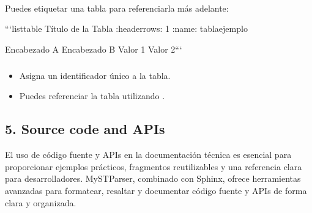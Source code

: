 \documentclass[a4paper,10pt,oneside,spanish,openany]{sphinxmanual}
\begin{document}
\paragraph{}
\label{\detokenize{configuracion_inicial/013.guia_de_myst_parser:agregar-una-etiqueta-a-una-tabla}}
\sphinxAtStartPar
Puedes etiquetar una tabla para referenciarla más adelante:

\begin{sphinxVerbatim}[commandchars=\\\{\}]
```\PYGZob{}list\PYGZhy{}table\PYGZcb{} Título de la Tabla
:header\PYGZhy{}rows: 1
:name: tabla\PYGZhy{}ejemplo

\PYGZhy{} Encabezado A
Encabezado B
\PYGZhy{} Valor 1
Valor 2```
\end{sphinxVerbatim}


\subparagraph{}
\label{\detokenize{configuracion_inicial/013.guia_de_myst_parser:id4}}\begin{itemize}
\item {} 
\sphinxAtStartPar
{} Asigna un identificador único a la tabla.

\item {} 
\sphinxAtStartPar
Puedes referenciar la tabla utilizando .

\end{itemize}


\subsection{5. Source code and APIs}
\label{\detokenize{configuracion_inicial/013.guia_de_myst_parser:source-code-and-apis}}
\sphinxAtStartPar
El uso de código fuente y APIs en la documentación técnica es esencial para proporcionar ejemplos prácticos, fragmentos reutilizables y una referencia clara para desarrolladores. MyST\sphinxhyphen{}Parser, combinado con Sphinx, ofrece herramientas avanzadas para formatear, resaltar y documentar código fuente y APIs de forma clara y organizada.


\subsubsection{}
\label{\detokenize{configuracion_inicial/013.guia_de_myst_parser:mostrar-codigo-fuente-en-markdown}}
\end{document}
